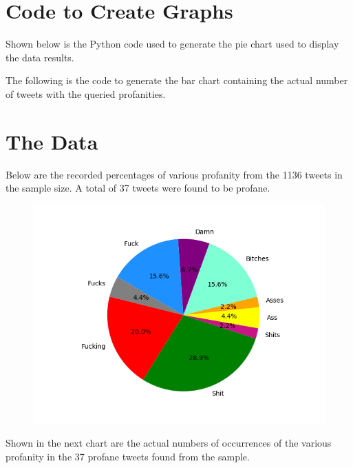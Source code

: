 \documentclass{article}
\begin{document}
\section{Code to Create Graphs}
\tab Shown below is the Python code used to generate the pie chart used to display the data results.\newline



The following is the code to generate the bar chart containing the actual number of tweets with the queried profanities.\newline



\section{The Data}
\tab Below are the recorded percentages of various profanity from the 1136 tweets in the sample size. A total of 37 tweets were found to be profane.

\begin{figure}[h]
	\includegraphics[scale=1]{Figure_1}
\end{figure}

Shown in the next chart are the actual numbers of occurrences of the various profanity in the 37 profane tweets found from the sample.
\end{document}
